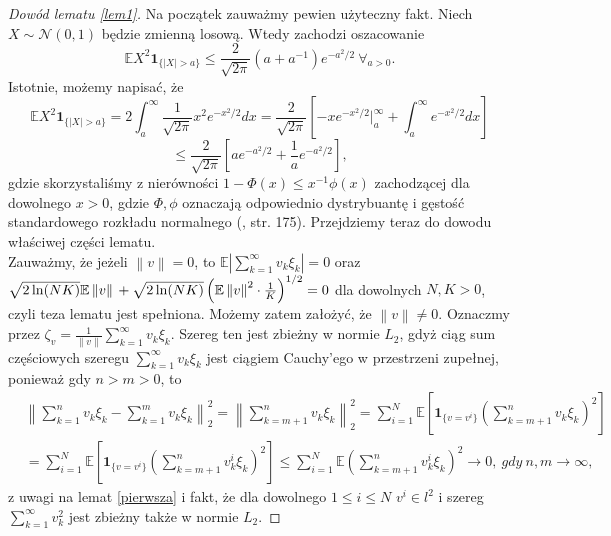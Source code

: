 \documentclass[man,mfiu]{mgrwms}
\newcommand{\norm}[1]{\left\lVert#1\right\rVert}
\begin{document}
\begin{proof} [Dowód lematu \ref{lem1}]
Na początek zauważmy pewien użyteczny fakt. Niech $X\sim \mathcal{N}(0,1)$ będzie zmienną losową. Wtedy zachodzi oszacowanie
\begin{displaymath}
\mathbb{E}X^2\pmb{1}_{\{|X|>a\}}\leq \frac{2}{\sqrt{2\pi}}(a+a^{-1})e^{-a^2/2}\ \forall_{a>0}.
\end{displaymath}
Istotnie, możemy napisać, że
\begin{displaymath}
\mathbb{E}X^2\pmb{1}_{\{|X|>a\}}=2\int_{a}^{\infty}\frac{1}{\sqrt{2\pi}}x^2e^{-x^2/2}dx=\frac{2}{\sqrt{2\pi}}\left[-xe^{-x^2/2}|_a^{\infty}+\int_a^{\infty}e^{-x^2/2}dx\right]
\end{displaymath}
\begin{displaymath}
\leq \frac{2}{\sqrt{2\pi}}\left[ae^{-a^2/2}+\frac{1}{a}e^{-a^2/2}\right],
\end{displaymath}
gdzie skorzystaliśmy z nierówności $1-\Phi(x)\leq x^{-1}\phi(x)$ zachodzącej dla dowolnego $x>0$, gdzie $\Phi,\phi$ oznaczają odpowiednio dystrybuantę i gęstość standardowego rozkładu normalnego (\cite{feller}, str. 175).
Przejdziemy teraz do dowodu właściwej części lematu.\\
Zauważmy, że jeżeli $\norm{v}=0$, to $\mathbb{E}\left|\sum_{k=1}^{\infty}v_k\xi_k\right|= 0$ oraz $\sqrt{2\ln (NK)}\mathbb{E}\norm{v}\\+\sqrt{2\ln (NK)}\left(\mathbb{E}\norm{v}^2\cdot \frac{1}{K}\right)^{1/2}= 0$ dla dowolnych $N,K>0$, czyli teza lematu jest spełniona. Możemy zatem założyć, że $\norm{v}\neq 0$. Oznaczmy przez $\zeta_v=\frac{1}{\norm{v}}\sum_{k=1}^{\infty}v_k\xi_k$. Szereg ten jest zbieżny w normie $L_2$, gdyż ciąg sum częściowych szeregu $\sum_{k=1}^{\infty}v_k\xi_k$ jest ciągiem Cauchy'ego w przestrzeni zupełnej, ponieważ gdy $n>m>0$, to
\begin{displaymath}
\begin{split}
&\norm{\sum_{k=1}^{n}v_k\xi_k-\sum_{k=1}^{m}v_k\xi_k}_2^2=\norm{\sum_{k=m+1}^{n}v_k\xi_k}_2^2=\sum_{i=1}^N\mathbb{E}\left[\pmb{1}_{\{v=v^i\}}\left(\sum_{k=m+1}^{n}v_k\xi_k\right)^2\right]\\
&=\sum_{i=1}^N\mathbb{E}\left[\pmb{1}_{\{v=v^i\}}\left(\sum_{k=m+1}^{n}v^i_k\xi_k\right)^2\right]\leq \sum_{i=1}^N\mathbb{E}\left(\sum_{k=m+1}^{n}v^i_k\xi_k\right)^2\to 0,\ gdy\ n,m\to\infty,
\end{split}
\end{displaymath}
z uwagi na lemat \ref{pierwsza} i fakt, że dla dowolnego $1\leq i\leq N$ $v^i\in l^2$ i szereg $\sum_{k=1}^{\infty}v_k^2$ jest zbieżny także w normie $L_2$.


\end{proof}
\end{document}
